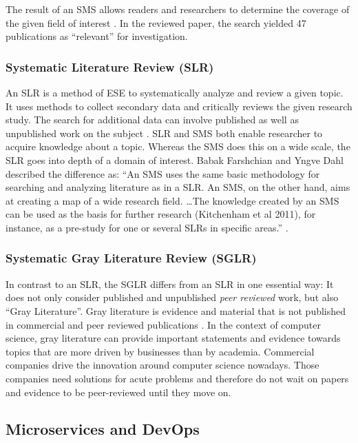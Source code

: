 The result of an SMS allows readers and researchers to determine the coverage of the given
field of interest \cite{petersen:SMS}. In the reviewed paper, the search yielded 47
publications as ``relevant'' for investigation.

\subsubsection{Systematic Literature Review (SLR)}

An SLR is a method of ESE to systematically analyze and review a given topic. It uses
methods to collect secondary data and critically reviews the given research study.
The search for additional data can involve published as well as unpublished work
on the subject \cite{siddaway:SLR}. SLR and SMS both enable researcher to acquire
knowledge about a topic. Whereas the SMS does this on a wide scale, the SLR
goes into depth of a domain of interest. Babak Farshchian and Yngve Dahl described
the difference as: ``An SMS uses the same basic methodology for searching and 
analyzing literature as in a SLR. An SMS, on the other hand, aims at
creating a map of a wide research field. \dots The knowledge created by an SMS can be
used as the basis for further research (Kitchenham et al 2011),
for instance, as a pre-study for one or several
SLRs in specific areas.'' \cite{farshchian:SMSvsSLR}.

\subsubsection{Systematic Gray Literature Review (SGLR)}

In contrast to an SLR, the SGLR differs from an SLR in one essential way:
It does not only consider published and unpublished \textit{peer reviewed} work,
but also ``Gray Literature''. Gray literature is evidence and material that
is not published in commercial and peer reviewed publications \cite{paez:GrayLiterature}.
In the context of computer science, gray literature can provide important statements
and evidence towards topics that are more driven by businesses than by academia.
Commercial companies drive the innovation around computer science nowadays.
Those companies need solutions for acute problems and therefore do not wait on papers and evidence
to be peer-reviewed until they move on.

\subsection{Microservices and DevOps}

